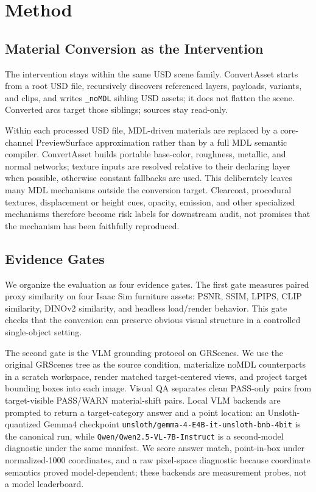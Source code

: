 \section{Method}
\label{sec:methodology}

\subsection{Material Conversion as the Intervention}
\label{sec:conversion_intervention}

The intervention stays within the same USD scene family. ConvertAsset starts
from a root USD file, recursively discovers referenced layers, payloads,
variants, and clips, and writes \texttt{\_noMDL} sibling USD assets; it does not
flatten the scene. Converted arcs target those siblings; sources stay read-only.

Within each processed USD file, MDL-driven materials are replaced by a
core-channel PreviewSurface approximation rather than by a full MDL semantic
compiler. ConvertAsset builds portable base-color, roughness, metallic, and
normal networks; texture inputs are resolved relative to their declaring layer
when possible, otherwise constant fallbacks are used. This deliberately leaves
many MDL mechanisms outside the conversion target. Clearcoat, procedural
textures, displacement or height cues, opacity, emission, and other specialized
mechanisms therefore become risk labels for downstream audit, not promises that
the mechanism has been faithfully reproduced.

\subsection{Evidence Gates}
\label{sec:evidence_gates}

We organize the evaluation as four evidence gates. The first gate measures
paired proxy similarity on four Isaac Sim furniture assets: PSNR, SSIM, LPIPS,
CLIP similarity, DINOv2 similarity, and headless load/render behavior. This
gate checks that the conversion can preserve obvious visual structure in a
controlled single-object setting.

The second gate is the VLM grounding protocol on GRScenes. We use
the original GRScenes tree as the source condition, materialize noMDL
counterparts in a scratch workspace, render matched target-centered views, and
project target bounding boxes into each image. Visual QA separates clean
PASS-only pairs from target-visible PASS/WARN material-shift pairs. Local VLM
backends are prompted to return a target-category answer and a point location:
an Unsloth-quantized Gemma4 checkpoint
\texttt{unsloth/\allowbreak gemma-4-E4B-it-\allowbreak unsloth-bnb-4bit} is
the canonical run, while
\texttt{Qwen/\allowbreak Qwen2.5-VL-7B-\allowbreak Instruct} is a second-model
diagnostic under the same manifest. We score answer match, point-in-box under
normalized-1000 coordinates, and a raw pixel-space diagnostic because coordinate
semantics proved model-dependent; these backends are measurement probes, not a
model leaderboard.

